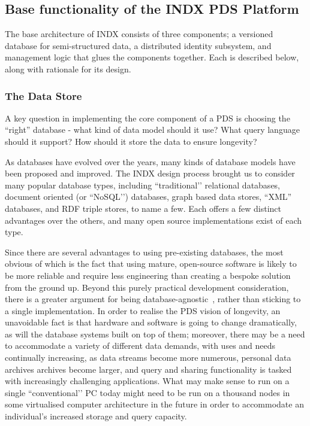 \documentclass[graybox]{svmult}
\begin{document}
\subsection{Base functionality of the INDX PDS Platform}

The base architecture of INDX consists of three components; a versioned database for semi-structured data, a distributed identity subsystem, and management logic that glues the components together.   Each is described below, along with rationale for its design.

\subsubsection{The Data Store}
A key question in implementing the core component of a PDS is choosing the “right” database - what kind of data model should it use? What query language should it support? How should it store the data to ensure longevity? 

As databases have evolved over the years, many kinds of database models have been proposed and improved.  The INDX design process brought us to consider many popular database types, including ``traditional’’ relational databases, document oriented (or ``NoSQL’’) databases, graph based data stores, “XML” databases, and RDF triple stores, to name a few.  Each offers a few distinct advantages over the others, and many open source implementations exist of each type.

Since there are several advantages to using pre-existing databases, the most obvious of which is the fact that using mature, open-source software is likely to be more reliable and require less engineering than creating a bespoke solution from the ground up. Beyond this purely practical development consideration, there is a greater argument for being database-agnostic~\cite{chohan2011database}, rather than sticking to a single implementation.  In order to realise the PDS vision of longevity, an unavoidable fact is that hardware and software is going to change dramatically, as will the database systems built on top of them; moreover, there may be a need to accommodate a variety of different data demands, with uses and needs continually increasing, as data streams become more numerous, personal data archives archives become larger, and query and sharing functionality is tasked with increasingly challenging applications.  What may make sense to run on a single ``conventional’’ PC today might need to be run on a thousand nodes in some virtualised computer architecture in the future in order to accommodate an individual’s increased storage and query capacity.
\end{document}
